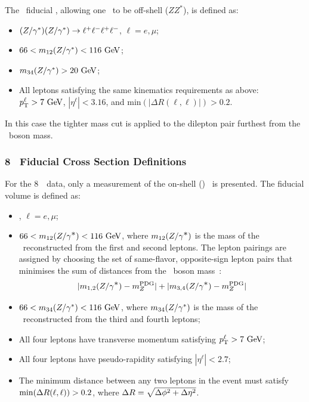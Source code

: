 The \ZZsllll\ fiducial \cx , allowing one \Z\ to be off-shell ($ZZ^*$), is defined as:

\begin{itemize}
\item $(Z/\gamma^*)(Z/\gamma^*)\rightarrow\ell^+ \ell^-\ell^+ \ell^-$, $\ell = e,\mu$;
\item $66 < m_{12}(\Z/\gamma^*) <  116\GeV$;
\item $m_{34}(\Z/\gamma^*) > 20\GeV$;
\item All leptons satisfying the same kinematics requirements as above:
$\pT^{\ell} > 7\GeV$,
$|\eta^{\ell}| < 3.16$,
and $\mathrm{min}(|\Delta R(\ell,\ell)|) > 0.2$.
\end{itemize}

In this case the tighter mass cut is applied to the dilepton pair furthest from the \Z\
boson mass.

\subsubsection{8 \tev\ Fiducial Cross Section Definitions}

For the 8~\tev\ data, only a measurement of the on-shell (\ZZ) \cx\ is
presented. The fiducial volume is defined as:

\begin{itemize}
\item{\ZorgZorgllll, $\ell = e,\mu$;}
\item{ $66 < m_{12}(\Zorgv) <  116\GeV$, where $m_{12}(Z/\gamma^{\textstyle *})$ is
the mass of the \Z\ reconstructed from the first and second leptons.  The
lepton pairings are assigned by choosing the set of 
same-flavor, opposite-sign lepton pairs that minimises the sum of distances from
the \Z\ boson mass~\cite{PDG}:
\begin{equation}
|m_{1,2}(Z/\gamma^{\textstyle *}) - m_{Z}^{\rm PDG}| + |m_{3,4}(Z/\gamma^{\textstyle *}) - m_{Z}^{\rm PDG}|
\end{equation}
}
\item{ $66 < m_{34}(\Z/\gamma^*) <  116\GeV$, where $m_{34}(Z/\gamma^*)$ is
the mass of the \Z\ reconstructed from the third and fourth leptons;}
\item All four leptons have transverse momentum satisfying $\pT^{\ell} > 7\GeV$;
\item All four leptons have pseudo-rapidity satisfying $|\eta^{\ell}| < 2.7$;
\item{ The minimum distance between any two leptons in the event must satisfy
$\mathrm{min}(\Delta R(\ell,\ell)) > 0.2$, where $\Delta R = \sqrt{\Delta \phi^{2} +
\Delta \eta^{2}}$.}
\end{itemize}


